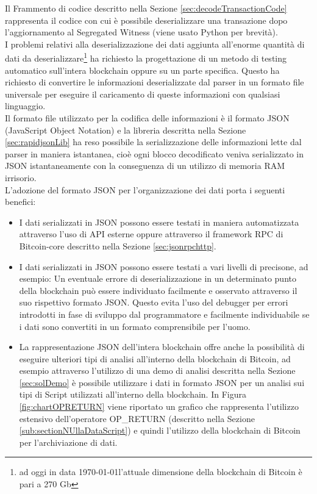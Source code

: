 Il Frammento di codice descritto nella Sezione \ref{sec:decodeTransactionCode} rappresenta il codice con cui è possibile deserializzare una transazione dopo l'aggiornamento al Segregated Witness (viene usato Python per brevità).\\
I problemi relativi alla deserializzazione dei dati aggiunta all'enorme quantità di dati da deserializzare\footnote{ad oggi in data \today  l'attuale dimensione della blockchain di Bitcoin è pari a 270 Gb} ha richiesto la progettazione di un metodo di testing automatico sull'intera blockchain oppure su un parte specifica.
Questo ha richiesto di convertire le informazioni deserializzate dal parser in un formato file universale per eseguire il caricamento di queste informazioni con qualsiasi linguaggio.\\
Il formato file utilizzato per la codifica delle informazioni è il formato JSON (JavaScript Object Notation) e la libreria descritta nella Sezione \ref{sec:rapidjsonLib} ha reso possibile la serializzazione delle informazioni lette dal parser in maniera istantanea, cioè ogni blocco decodificato veniva serializzato in JSON istantaneamente con la conseguenza di un utilizzo di memoria RAM irrisorio.\\
L'adozione del formato JSON per l'organizzazione dei dati porta i seguenti benefici:
\begin{itemize}
  \item I dati serializzati in JSON possono essere testati in maniera automatizzata attraverso l'uso di API esterne oppure attraverso il framework RPC di Bitcoin-core descritto nella Sezione \ref{sec:jsonrpchttp}.
  \item I dati serializzati in JSON possono essere testati a vari livelli di precisone, ad esempio: Un eventuale errore di deserializzazione in un determinato punto della blockchain può essere individuato facilmente e osservato attraverso il suo rispettivo formato JSON.
  Questo evita l'uso del debugger per errori introdotti in fase di sviluppo dal programmatore e facilmente individuabile se i dati sono convertiti in un formato comprensibile per l'uomo.
  \item La rappresentazione JSON dell'intera blockchain offre anche la possibilità di eseguire ulteriori tipi di analisi all'interno della blockchain di Bitcoin, ad esempio attraverso l'utilizzo di una demo di analisi descritta nella Sezione \ref{sec:solDemo} è possibile utilizzare i dati in formato JSON per un analisi sui tipi di Script utilizzati all'interno della blockchain.
  In Figura \ref{fig:chartOPRETURN} viene riportato un grafico che rappresenta l'utilizzo estensivo dell'operatore OP\_RETURN (descritto nella Sezione \ref{sub:sectionNUllaDataScript}) e quindi l'utilizzo della blockchain di Bitcoin per l'archiviazione di dati.
\end{itemize}

